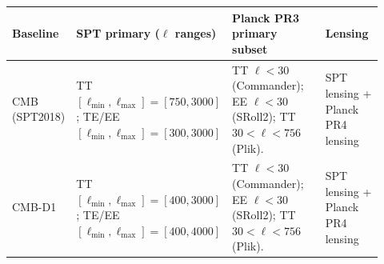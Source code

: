 \begin{tabular}{@{} p{0.13\linewidth} p{0.28\linewidth} p{0.33\linewidth} p{0.18\linewidth} @{}}
\toprule
Baseline & SPT primary ($\ell$ ranges) & Planck PR3 primary subset & Lensing \\
\midrule
CMB (SPT2018) & TT $[\ell_{\min},\ell_{\max}]{=}[750,3000]$; TE/EE $[\ell_{\min},\ell_{\max}]{=}[300,3000]$ & TT $\ell<30$ (Commander); EE $\ell<30$ (SRoll2); TT $30<\ell<756$ (Plik). & SPT lensing + Planck PR4 lensing \\
CMB-D1 & TT $[\ell_{\min},\ell_{\max}]{=}[400,3000]$; TE/EE $[\ell_{\min},\ell_{\max}]{=}[400,4000]$ & TT $\ell<30$ (Commander); EE $\ell<30$ (SRoll2); TT $30<\ell<756$ (Plik). & SPT lensing + Planck PR4 lensing \\
\bottomrule
\end{tabular}
